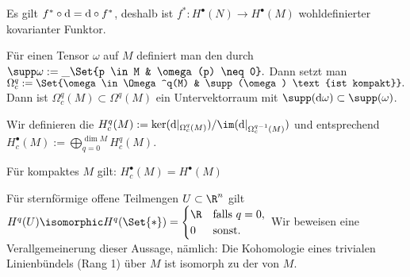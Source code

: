 Es gilt $f^* \circ \mathrm{d} = \mathrm{d} \circ f^*$, deshalb ist $f^*: H^\bullet(N) \to H^\bullet(M)$ wohldefinierter kovarianter Funktor.

\begin{df} \label{6.17}
    Für einen Tensor $\omega$ auf $M$ definiert man den  durch
    \begin{math}
        \supp \omega := \_{\Set{p \in M & \omega(p) \neq 0}}.
    \end{math}
    Dann setzt man
    \begin{math}
        \Omega_c^q := \Set{\omega \in \Omega^q(M) & \supp(\omega) \text{ist kompakt}}.
    \end{math}
    Dann ist $\Omega_c^q(M) \subset \Omega^q(M)$ ein Untervektorraum mit $\supp(\d \omega) \subset \supp(\omega)$.

    Wir definieren die 
    \begin{math}
        H_c^q(M) := \ker(\d|_{\Omega_c^q(M)}) / \im(\d|_{\Omega_c^{q-1}(M)})
    \end{math}
    und entsprechend $H_c^\bullet(M) := \bigoplus_{q=0}^{\dim M} H_c^q(M)$.

    \begin{note}
        Für kompaktes $M$ gilt: $H_c^\bullet(M) = H^\bullet(M)$
    \end{note}
\end{df}

Für sternförmige offene Teilmengen $U \subset \R^n$ gilt
\begin{math}
    H^q(U) \isomorphic H^q(\Set{\ast})
    = \begin{cases}
        \R & \text{falls $q = 0$}, \\
        0 & \text{sonst}.
    \end{cases}
\end{math}
Wir beweisen eine Verallgemeinerung dieser Aussage, nämlich:
Die Kohomologie eines trivialen Linienbündels (Rang 1) über $M$ ist isomorph zu der von $M$.


